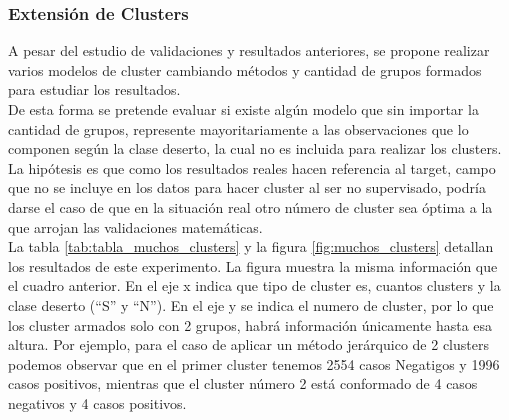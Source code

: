 \subsubsection{\textbf{Extensión de Clusters}}

A pesar del estudio de validaciones y resultados anteriores,
se propone realizar varios modelos de cluster cambiando métodos y cantidad de grupos formados para estudiar los resultados. \\
De esta forma se pretende evaluar si existe algún modelo que sin importar la cantidad de grupos, represente mayoritariamente a las observaciones que lo componen según la clase deserto, la cual no es incluida para realizar los clusters.\\
La hipótesis es que como los resultados reales hacen referencia al target,
campo que no se incluye en los datos para hacer cluster al ser no
supervisado, podría darse el caso de que en la situación real otro
número de cluster sea óptima a la que arrojan las validaciones
matemáticas.\\

La tabla \ref{tab:tabla_muchos_clusters} y la figura \ref{fig:muchos_clusters} detallan los resultados de este experimento. La figura muestra la misma información que el cuadro anterior. En el eje
x indica que tipo de cluster es, cuantos clusters y la clase deserto
(``S'' y ``N''). En el eje y se indica el numero de cluster, por lo que
los cluster armados solo con 2 grupos, habrá información únicamente
hasta esa altura. Por ejemplo, para el caso de aplicar un método
jerárquico de 2 clusters podemos observar que en el primer cluster
tenemos 2554 casos Negatigos y 1996 casos positivos, mientras que el
cluster número 2 está conformado de 4 casos negativos y 4 casos
positivos.


